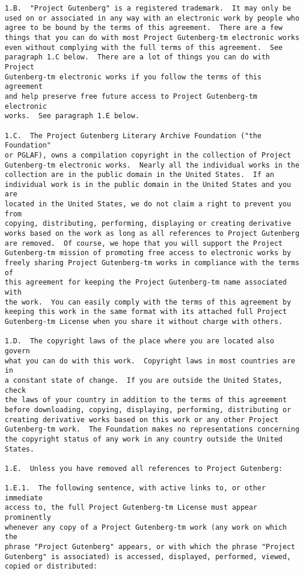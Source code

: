 \begin{Verbatim}[fontsize=\footnotesize]
1.B.  "Project Gutenberg" is a registered trademark.  It may only be
used on or associated in any way with an electronic work by people who
agree to be bound by the terms of this agreement.  There are a few
things that you can do with most Project Gutenberg-tm electronic works
even without complying with the full terms of this agreement.  See
paragraph 1.C below.  There are a lot of things you can do with Project
Gutenberg-tm electronic works if you follow the terms of this agreement
and help preserve free future access to Project Gutenberg-tm electronic
works.  See paragraph 1.E below.

1.C.  The Project Gutenberg Literary Archive Foundation ("the Foundation"
or PGLAF), owns a compilation copyright in the collection of Project
Gutenberg-tm electronic works.  Nearly all the individual works in the
collection are in the public domain in the United States.  If an
individual work is in the public domain in the United States and you are
located in the United States, we do not claim a right to prevent you from
copying, distributing, performing, displaying or creating derivative
works based on the work as long as all references to Project Gutenberg
are removed.  Of course, we hope that you will support the Project
Gutenberg-tm mission of promoting free access to electronic works by
freely sharing Project Gutenberg-tm works in compliance with the terms of
this agreement for keeping the Project Gutenberg-tm name associated with
the work.  You can easily comply with the terms of this agreement by
keeping this work in the same format with its attached full Project
Gutenberg-tm License when you share it without charge with others.

1.D.  The copyright laws of the place where you are located also govern
what you can do with this work.  Copyright laws in most countries are in
a constant state of change.  If you are outside the United States, check
the laws of your country in addition to the terms of this agreement
before downloading, copying, displaying, performing, distributing or
creating derivative works based on this work or any other Project
Gutenberg-tm work.  The Foundation makes no representations concerning
the copyright status of any work in any country outside the United
States.

1.E.  Unless you have removed all references to Project Gutenberg:

1.E.1.  The following sentence, with active links to, or other immediate
access to, the full Project Gutenberg-tm License must appear prominently
whenever any copy of a Project Gutenberg-tm work (any work on which the
phrase "Project Gutenberg" appears, or with which the phrase "Project
Gutenberg" is associated) is accessed, displayed, performed, viewed,
copied or distributed:


\end{Verbatim}
